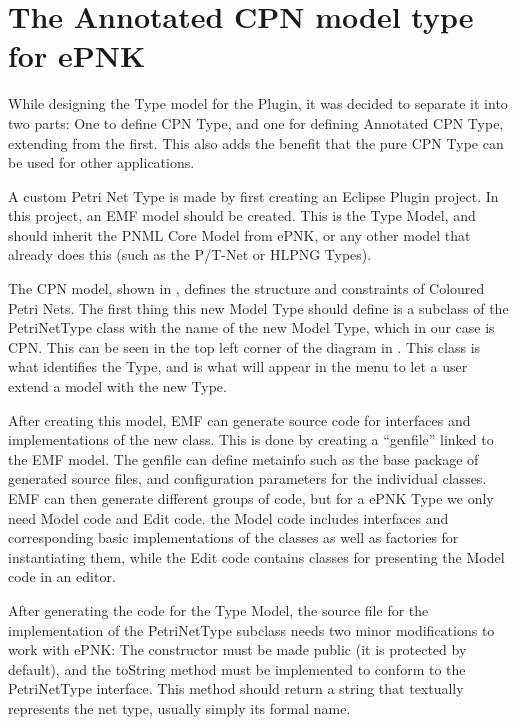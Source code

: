 
\section{The Annotated CPN model type for ePNK}
While designing the Type model for the Plugin, it was decided to separate it
into two parts: One to define CPN Type, and one for defining Annotated CPN Type,
extending from the first. This also adds the benefit that the pure CPN Type can
be used for other applications.

A custom Petri Net Type is made by first creating an Eclipse Plugin project. 
In this project, an EMF model should be created. This is the Type Model, and
should inherit the PNML Core Model from ePNK, or any other model that already
does this (such as the P/T-Net or HLPNG Types). 

The CPN model, shown in , defines the structure and
constraints of Coloured Petri Nets. The first thing this new Model Type should
define is a subclass of the PetriNetType class with the name of the new Model
Type, which in our case is CPN. This can be seen in the top left corner of the
diagram in . This class is what identifies the Type,
and is what will appear in the menu to let a user extend a model with the new
Type.

After creating this model, EMF can generate source code for interfaces and
implementations of the new class. This is done by creating a ``genfile''
linked to the EMF model. The genfile can define metainfo such as the base
package of generated source files, and configuration parameters for the
individual classes. EMF can then generate different groups of code, but for a
ePNK Type we only need Model code and Edit code. the Model code includes
interfaces and corresponding basic implementations of the classes as well as
factories for instantiating them, while the Edit code contains classes for
presenting the Model code in an editor.

After generating the code for the Type Model, the source file for
the implementation of the PetriNetType subclass needs two minor modifications
to work with ePNK: The constructor must be made public (it is protected by
default), and the toString method must be implemented to conform to the
PetriNetType interface. This method should return a string that textually
represents the net type, usually simply its formal name.

